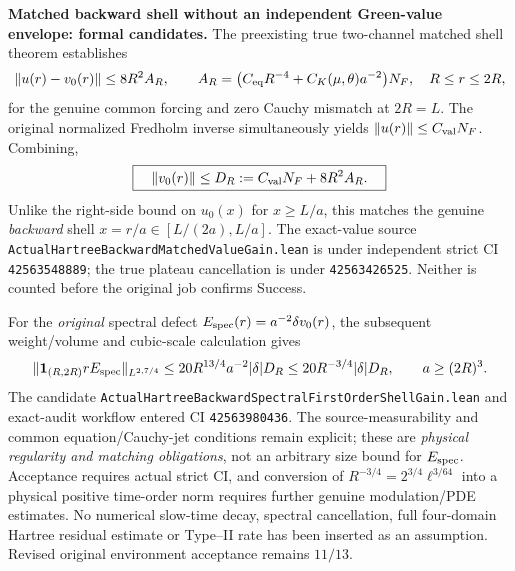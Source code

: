 \documentclass[11pt]{amsart}
\begin{document}
\medskip
\noindent\textbf{Matched backward shell without an independent
Green-value envelope: formal candidates.}
The preexisting true two-channel matched shell theorem establishes
\[
  \|u(r)-v_0(r)\|\le
 8R^2 A_R,\qquad
 A_R=\bigl(C_{\rm eq}R^{-4}
       +C_K(\mu,\theta)a^{-2}\bigr)N_F,
  \quad R\le r\le2R,
\]
for the genuine common forcing and zero Cauchy mismatch at \(2R=L\).
The original normalized Fredholm inverse simultaneously yields
\(\|u(r)\|\le C_{\rm val}N_F\). Combining,
\[
  \boxed{\quad
  \|v_0(r)\|\le D_R:=
    C_{\rm val}N_F+8R^2A_R.
  \quad}
\]
Unlike the right-side bound on \(u_0(x)\) for \(x\ge L/a\),
this matches the genuine \emph{backward} shell
\(x=r/a\in[L/(2a),L/a]\).
The exact-value source
\texttt{ActualHartreeBackwardMatchedValueGain.lean}
is under independent strict CI \texttt{42563548889};
the true plateau cancellation is under \texttt{42563426525}.
Neither is counted before the original job confirms Success.

For the \emph{original} spectral defect
\(E_{\rm spec}(r)=a^{-2}\delta v_0(r)\),
the subsequent weight/volume and cubic-scale calculation gives
\[
 \|{\bf1}_{(R,2R)}rE_{\rm spec}\|_{L^{2,7/4}}
 \le20R^{13/4}a^{-2}|\delta|D_R
 \le20 R^{-3/4}|\delta|D_R,
 \qquad a\ge (2R)^3 .
\]
The candidate
\texttt{ActualHartreeBackwardSpectralFirstOrderShellGain.lean}
and exact-audit workflow entered CI \texttt{42563980436}.
The source-measurability and common equation/Cauchy-jet
conditions remain explicit; these are
\emph{physical regularity and matching obligations},
not an arbitrary size bound for \(E_{\rm spec}\).
Acceptance requires actual strict CI, and conversion of
\(R^{-3/4}=\!2^{3/4}\ell^{3/64}\) into a physical positive
time-order norm requires further genuine modulation/PDE estimates.
No numerical slow-time decay, spectral cancellation,
full four-domain Hartree residual estimate or Type--II rate
has been inserted as an assumption. Revised original
environment acceptance remains \(11/13\).
\end{document}
